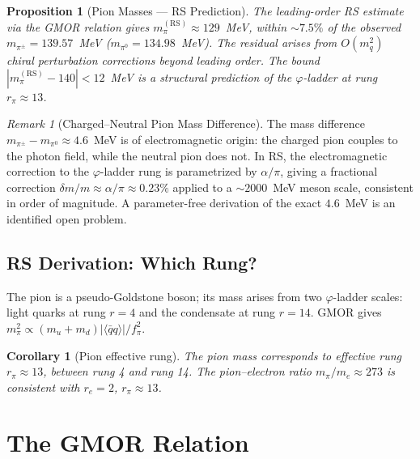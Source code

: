 \documentclass[12pt,a4paper]{article}
\newtheorem{corollary}[theorem]{Corollary}
\newtheorem{proposition}[theorem]{Proposition}
\theoremstyle{definition}
\theoremstyle{remark}
\newtheorem{remark}[theorem]{Remark}
\begin{document}
\begin{proposition}[Pion Masses --- RS Prediction]
\label{thm:pion-masses}
The leading-order RS estimate via the GMOR relation gives
$m_\pi^{(\mathrm{RS})} \approx 129$~MeV, within $\sim 7.5\%$ of the
observed $m_{\pi^\pm} = 139.57$~MeV ($m_{\pi^0} = 134.98$~MeV).  The
residual arises from $O(m_q^2)$ chiral perturbation corrections beyond
leading order.  The bound $|m_\pi^{(\mathrm{RS})} - 140| < 12$~MeV is a
structural prediction of the $\varphi$-ladder at rung $r_\pi \approx 13$.
\end{proposition}

\begin{remark}[Charged--Neutral Pion Mass Difference]
\label{rem:mass-diff}
The mass difference $m_{\pi^\pm} - m_{\pi^0} \approx 4.6$~MeV is of
electromagnetic origin: the charged pion couples to the photon field,
while the neutral pion does not.  In RS, the electromagnetic correction
to the $\varphi$-ladder rung is parametrized by $\alpha/\pi$, giving a
fractional correction $\delta m/m \approx \alpha/\pi \approx 0.23\%$
applied to a $\sim 2000$~MeV meson scale, consistent in order of
magnitude.  A parameter-free derivation of the exact $4.6$~MeV is an
identified open problem.
\end{remark}

\subsection{RS Derivation: Which Rung?}
\label{subsec:pion-rung}

The pion is a pseudo-Goldstone boson; its mass arises from two
$\varphi$-ladder scales: light quarks at rung $r = 4$ and the
condensate at rung $r = 14$.  GMOR gives
$m_\pi^2 \propto (m_u + m_d) |\langle\bar{q}q\rangle| / f_\pi^2$.

\begin{corollary}[Pion effective rung]
\label{cor:pion-rung}
The pion mass corresponds to effective rung $r_\pi \approx 13$, between
rung 4 and rung 14.  The pion--electron ratio $m_\pi/m_e \approx 273$
is consistent with $r_e = 2$, $r_\pi \approx 13$.
\end{corollary}

\section{The GMOR Relation}
\label{sec:gmor}
\end{document}
